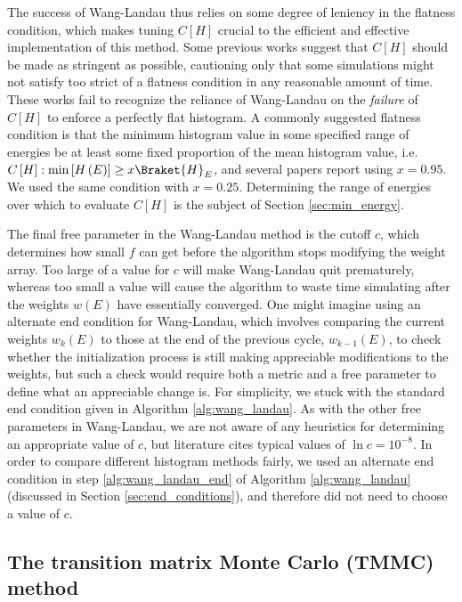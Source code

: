 \documentclass[11pt]{article}
\newcommand{\bk}{\Braket} %
\newcommand{\p}[1]{\left(#1\right)} %
\renewcommand{\sp}[1]{\left[#1\right]} %
\begin{document}
The success of Wang-Landau thus relies on some degree of leniency in
the flatness condition, which makes tuning $C\sp{H}$ crucial to the
efficient and effective implementation of this method. Some previous
works\cite{wang_landau} suggest that $C\sp{H}$ should be made as
stringent as possible, cautioning only that some simulations might not
satisfy too strict of a flatness condition in any reasonable amount of
time. These works fail to recognize the reliance of Wang-Landau on the
{\it failure} of $C\sp{H}$ to enforce a perfectly flat histogram. A
commonly suggested flatness condition is that the minimum histogram
value in some specified range of energies be at least some fixed
proportion of the mean histogram value, i.e.
$C\sp{H}:\min\sp{H\p{E}}\ge x\bk{H}_E$, and several papers report
using $x=0.95$. We used the same condition with $x=0.25$. Determining
the range of energies over which to evaluate $C\sp{H}$ is the subject
of Section \ref{sec:min_energy}.

The final free parameter in the Wang-Landau method is the cutoff $c$,
which determines how small $f$ can get before the algorithm stops
modifying the weight array. Too large of a value for $c$ will make
Wang-Landau quit prematurely, whereas too small a value will cause the
algorithm to waste time simulating after the weights $w\p{E}$ have
essentially converged. One might imagine using an alternate end
condition for Wang-Landau, which involves comparing the current
weights $w_k\p{E}$ to those at the end of the previous cycle,
$w_{k-1}\p{E}$, to check whether the initialization process is still
making appreciable modifications to the weights, but such a check
would require both a metric and a free parameter to define what an
appreciable change is. For simplicity, we stuck with the standard end
condition given in Algorithm \ref{alg:wang_landau}. As with the other
free parameters in Wang-Landau, we are not aware of any heuristics for
determining an appropriate value of $c$, but literature cites typical
values of $\ln c=10^{-8}$. In order to compare different histogram
methods fairly, we used an alternate end condition in step
\ref{alg:wang_landau_end} of Algorithm \ref{alg:wang_landau}
(discussed in Section \ref{sec:end_conditions}), and therefore did not
need to choose a value of $c$.

\subsection{The transition matrix Monte Carlo (TMMC) method}
\label{sec:tmmc}
\end{document}
